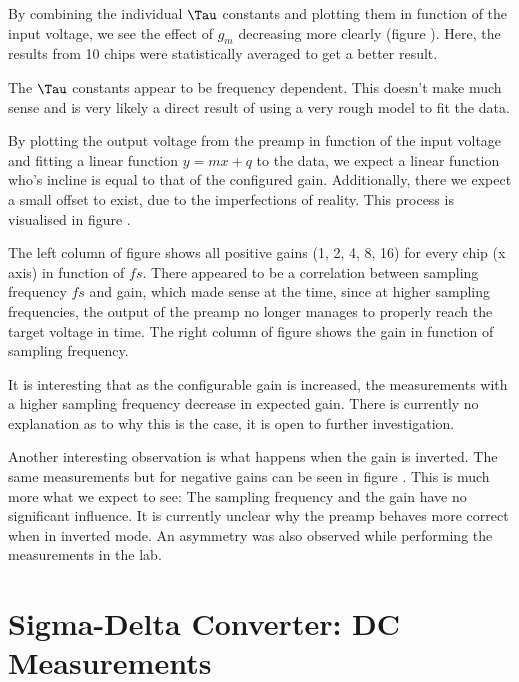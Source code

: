 By combining the individual $\Tau$ constants and  plotting them in function of
the input voltage, we see the  effect of $g_m$ decreasing more clearly (figure
).  Here,  the  results from 10 chips were
statistically averaged to get a better result.

The $\Tau$ constants  appear to be frequency dependent. This doesn't make much
sense and is very likely a direct  result  of  using a very rough model to fit
the data.

By  plotting  the output voltage from the preamp  in  function  of  the  input
voltage and fitting a linear function $y=mx+q$ to the data, we expect a linear
function who's  incline is equal to that of the configured gain. Additionally,
there  we expect a small offset to exist, due to the imperfections of reality.
This  process  is  visualised  in  figure .

The  left  column of figure   shows  all  positive
gains (1, 2, 4, 8, 16) for every chip (x  axis)  in  function  of  $fs$. There
appeared to be a  correlation  between sampling frequency $fs$ and gain, which
made  sense  at the time, since at higher sampling frequencies, the output  of
the preamp no longer manages to properly reach the target voltage in time. The
right column of figure  shows  the  gain in function
of  sampling  frequency.

It is interesting that as the configurable gain is increased, the measurements
with a higher sampling frequency decrease in expected gain. There is currently
no  explanation  as  to  why  this  is  the  case,  it   is  open  to  further
investigation.

Another interesting observation is what happens when the gain is inverted. The
same  measurements  but   for   negative   gains   can   be   seen  in  figure
. This is much more  what  we  expect  to see: The
sampling frequency and the gain have no significant influence. It is currently
unclear  why  the  preamp  behaves  more correct when  in  inverted  mode.  An
asymmetry  was  also observed while performing the measurements  in  the  lab.

\section{Sigma-Delta Converter: DC Measurements}
\label{sec:sigdelDC}

